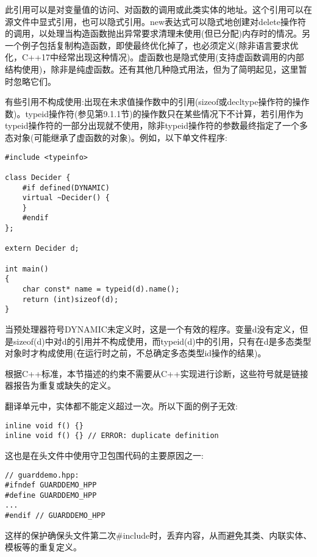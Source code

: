 此引用可以是对变量值的访问、对函数的调用或此类实体的地址。这个引用可以在源文件中显式引用，也可以隐式引用。new表达式可以隐式地创建对delete操作符的调用，以处理当构造函数抛出异常要求清理未使用(但已分配)内存时的情况。另一个例子包括复制构造函数，即使最终优化掉了，也必须定义(除非语言要求优化，C++17中经常出现这种情况)。虚函数也是隐式使用(支持虚函数调用的内部结构使用)，除非是纯虚函数。还有其他几种隐式用法，但为了简明起见，这里暂时忽略它们。

有些引用不构成使用:出现在未求值操作数中的引用(sizeof或decltype操作符的操作数)。typeid操作符(参见第9.1.1节)的操作数只在某些情况下不计算，若引用作为typeid操作符的一部分出现就不使用，除非typeid操作符的参数最终指定了一个多态对象(可能继承了虚函数的对象)。例如，以下单文件程序:

\begin{lstlisting}[style=styleCXX]
#include <typeinfo>

class Decider {
	#if defined(DYNAMIC)
	virtual ~Decider() {
	}
	#endif
};

extern Decider d;

int main()
{
	char const* name = typeid(d).name();
	return (int)sizeof(d);
}
\end{lstlisting}

当预处理器符号DYNAMIC未定义时，这是一个有效的程序。变量d没有定义，但是sizeof(d)中对d的引用并不构成使用，而typeid(d)中的引用，只有在d是多态类型对象时才构成使用(在运行时之前，不总确定多态类型id操作的结果)。

根据C++标准，本节描述的约束不需要从C++实现进行诊断，这些符号就是链接器报告为重复或缺失的定义。


翻译单元中，实体都不能定义超过一次。所以下面的例子无效:

\begin{lstlisting}[style=styleCXX]
inline void f() {}
inline void f() {} // ERROR: duplicate definition
\end{lstlisting}

这也是在头文件中使用守卫包围代码的主要原因之一:

\begin{lstlisting}[style=styleCXX]
// guarddemo.hpp:
#ifndef GUARDDEMO_HPP
#define GUARDDEMO_HPP
...
#endif // GUARDDEMO_HPP
\end{lstlisting}

这样的保护确保头文件第二次\#include时，丢弃内容，从而避免其类、内联实体、模板等的重复定义。


